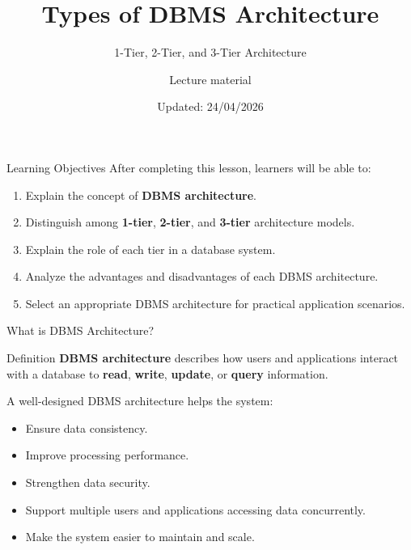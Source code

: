 \documentclass[aspectratio=169,11pt]{beamer}
\title[Types of DBMS Architecture]{Types of DBMS Architecture}
\subtitle{1-Tier, 2-Tier, and 3-Tier Architecture}
\author{Lecture material}
\institute{Course: Database Systems}
\date{Updated: 24/04/2026}
\newcommand{\keyword}[1]{\textcolor{accent}{\textbf{#1}}}
\newcommand{\tightlist}{\setlength{\itemsep}{2pt}\setlength{\parskip}{0pt}}
\begin{document}
\begin{frame}
  \titlepage
\end{frame}

\begin{frame}{Learning Objectives}
\small
After completing this lesson, learners will be able to:
\begin{enumerate}
\tightlist
  \item Explain the concept of \keyword{DBMS architecture}.
  \item Distinguish among \keyword{1-tier}, \keyword{2-tier}, and \keyword{3-tier} architecture models.
  \item Explain the role of each tier in a database system.
  \item Analyze the advantages and disadvantages of each DBMS architecture.
  \item Select an appropriate DBMS architecture for practical application scenarios.
\end{enumerate}
\end{frame}

\begin{frame}{What is DBMS Architecture?}
\small
\begin{block}{Definition}
\keyword{DBMS architecture} describes how users and applications interact with a database to \textbf{read}, \textbf{write}, \textbf{update}, or \textbf{query} information.
\end{block}

A well-designed DBMS architecture helps the system:
\begin{itemize}
\tightlist
  \item Ensure data consistency.
  \item Improve processing performance.
  \item Strengthen data security.
  \item Support multiple users and applications accessing data concurrently.
  \item Make the system easier to maintain and scale.
\end{itemize}
\end{frame}
\end{document}
